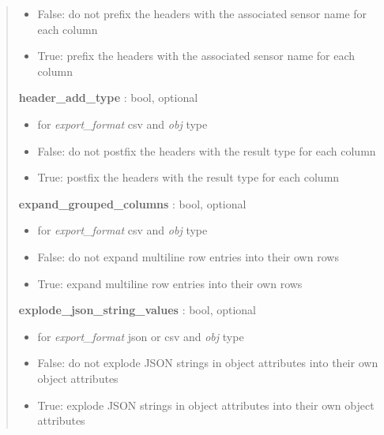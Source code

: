 \documentclass[letterpaper,10pt,english]{sphinxmanual}
\begin{document}
\begin{fulllineitems}
\begin{quote}
\begin{description}
\begin{itemize}
\item {} 
False: do not prefix the headers with the associated sensor name for each column

\item {} 
True: prefix the headers with the associated sensor name for each column

\end{itemize}

\textbf{header\_add\_type} : bool, optional
\begin{itemize}
\item {} 
for \emph{export\_format} csv and \emph{obj} type {\hyperref[taniumpy.object_types:taniumpy.object_types.result_set.ResultSet]{}}

\item {} 
False: do not postfix the headers with the result type for each column

\item {} 
True: postfix the headers with the result type for each column

\end{itemize}

\textbf{expand\_grouped\_columns} : bool, optional
\begin{itemize}
\item {} 
for \emph{export\_format} csv and \emph{obj} type {\hyperref[taniumpy.object_types:taniumpy.object_types.result_set.ResultSet]{}}

\item {} 
False: do not expand multiline row entries into their own rows

\item {} 
True: expand multiline row entries into their own rows

\end{itemize}

\textbf{explode\_json\_string\_values} : bool, optional
\begin{itemize}
\item {} 
for \emph{export\_format} json or csv and \emph{obj} type {\hyperref[taniumpy.object_types:taniumpy.object_types.base.BaseType]{}}

\item {} 
False: do not explode JSON strings in object attributes into their own object attributes

\item {} 
True: explode JSON strings in object attributes into their own object attributes


\end{itemize}
\end{description}
\end{quote}
\end{fulllineitems}
\end{document}
